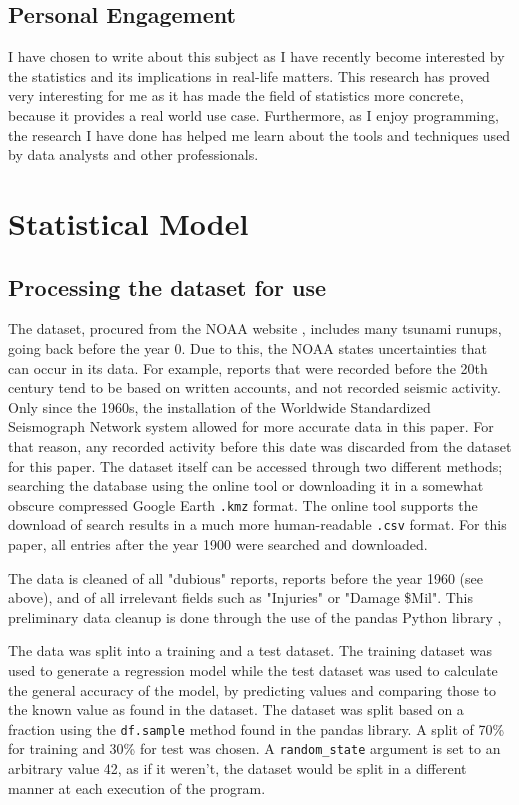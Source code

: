 \documentclass[11pt,letterpaper]{article}
\begin{document}
\subsection{Personal Engagement}

I have chosen to write about this subject as I have recently become interested by the
statistics and its implications in real-life matters. This research has proved very
interesting for me as it has made the field of statistics more concrete, because it provides 
a real world use case. Furthermore, as I enjoy programming, the research I have done 
has helped me learn about the tools and techniques used by data analysts and other professionals.

\section{Statistical Model}

\subsection{Processing the dataset for use}
The dataset, procured from the NOAA website \cite{noaa}, includes many tsunami
runups, going back before the year 0. Due to this, the NOAA states uncertainties
that can occur in its data. For example, reports that were recorded before the
20th century tend to be based on written accounts, and not recorded seismic activity.
Only since the 1960s, the installation of the Worldwide Standardized Seismograph
Network system allowed for more accurate data in this paper. For that reason, any recorded
activity before this date was discarded from the dataset for this paper. The dataset itself can
be accessed through two different methods; searching the database using the online
tool or downloading it in a somewhat obscure compressed Google Earth \verb|.kmz| format. 
The online tool supports the download of search results in a much more human-readable 
\verb|.csv| format. For this paper, all entries after the year 1900 were searched and downloaded.

The data is cleaned of all "dubious" reports, reports before the year 1960 (see above), and
of all irrelevant fields such as "Injuries" or "Damage \$Mil". This preliminary data cleanup
is done through the use of the pandas Python library \cite{reback2020pandas}\cite{mckinney-proc-scipy-2010},

The data was split into a training and a test dataset. The training
dataset was used to generate a regression model while the test dataset was used 
to calculate the general accuracy of the model, by predicting values and
comparing those to the known value as found in the dataset. The dataset was split based on
a fraction using the \verb|df.sample| method found in the pandas library. A split
of 70\% for training and 30\% for test was chosen. A \verb|random_state| argument is
set to an arbitrary value 42, as if it weren't, the dataset would be split in a different
manner at each execution of the program.
\end{document}
